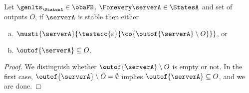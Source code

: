 {%





\begin{lemma}{\label{lem:must-gen-acc-stable}}
  Let $\genlts_{\StatesA} \in \obaFB$.
  $\Forevery \serverA \in \StatesA$ and set of outputs $O$,
  if $\serverA$ is stable then either
  \begin{enumerate}[(a)]
  \item $\musti{\serverA}{\testacc{\varepsilon}{\co{ \outof{\serverA} \setminus O}} }$, or
  \item $\outof{\serverA} \subseteq O$.
  \end{enumerate}
\end{lemma}
\begin{proof}
We distinguish whether $\outof{\serverA} \setminus O$ is empty or not.
In the first case, $\outof{\serverA} \setminus O = \emptyset$ implies
$\outof{\serverA} \subseteq O$, and we are done.


\end{proof}}
